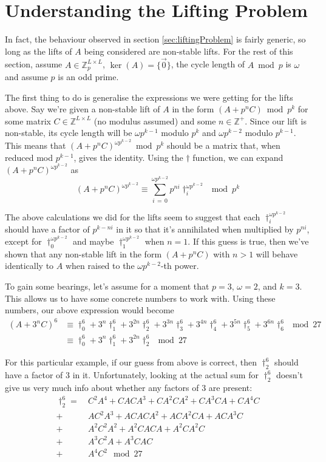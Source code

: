 \documentclass[a4paper, 12pt, reqno]{amsart}
\begin{document}
	\section{Understanding the Lifting Problem}
		\label{sec:understanding1}
		In fact, the behaviour observed in section \ref{sec:liftingProblem} is fairly generic, so long as the lifts of $A$ being considered are non-stable lifts. For the 
		rest of this section, assume $A \in \mathds{Z}_p^{L \times L}$, $\ker(A) = \{\vec{0}\}$, the cycle length of $A \bmod{p}$ is $\omega$ and assume $p$ is an odd prime.
		
		The first thing to do is generalise the expressions we were getting for the lifts above. Say we're given a non-stable lift of $A$ in the form $(A + p^nC) \bmod{p^k}$
		for some matrix $C \in \mathds{Z}^{L \times L}$ (no modulus assumed) and some $n \in \mathds{Z}^+$. Since our lift is non-stable, its cycle length will be 
		$\omega p^{k-1}$ modulo $p^k$ and $\omega p^{k-2}$ modulo $p^{k-1}$. This means that $(A + p^nC)^{\omega p^{k-2}} \bmod{p^k}$ should be a matrix that, when reduced 
		mod $p^{k-1}$, gives the identity. Using the $\dag$ function, we can expand $(A + p^nC)^{\omega p^{k-2}}$ as
		\[
			(A + p^nC)^{\omega p^{k-2}} \equiv \sum_{i\,=\,0}^{\omega p^{k-2}} p^{ni}\dag_i^{\omega p^{k-2}} \mod{p^k}
		\]
		
		The above calculations we did for the lifts seem to suggest that each $\dag_i^{\omega p^{k-2}}$ should have a factor of $p^{k - ni}$ in it so that it's
		annihilated when multiplied by $p^{ni}$, except for $\dag_0^{\omega p^{k-2}}$ and maybe $\dag_1^{\omega p^{k-2}}$ when $n = 1$. If this guess is true, then we've 
		shown that any non-stable lift in the form $(A + p^nC)$ with $n > 1$ will behave identically to $A$ when raised to the $\omega p^{k-2}$-th power.
		
		To gain some bearings, let's assume for a moment that $p = 3$, $\omega = 2$, and $k = 3$. This allows us to have some concrete numbers to work with. Using these
		numbers, our above expression would become
		\begin{align*}
			(A + 3^nC)^6 & \equiv \dag_0^6 + 3^n\dag_1^6 + 3^{2n}\dag_2^6 + 3^{3n}\dag_3^6 + 3^{4n}\dag_4^6 + 3^{5n}\dag_5^6 + 3^{6n}\dag_6^6 \mod{27} \\
			             & \equiv \dag_0^6 + 3^n\dag_1^6 + 3^{2n}\dag_2^6 \mod{27}
		\end{align*}
		
		For this particular example, if our guess from above is correct, then $\dag_2^6$ should have a factor of 3 in it. Unfortunately, looking at the actual sum for 
		$\dag_2^6$ doesn't give us very much info about whether any factors of 3 are present:
		\begin{align*}
			\dag_2^6 =& \ C^2A^4    + CACA^3  + CA^2CA^2 + CA^3CA + CA^4C \\
			         +& \ AC^2A^3   + ACACA^2 + ACA^2CA  + ACA^3C         \\
					 +& \ A^2C^2A^2 + A^2CACA + A^2CA^2C                  \\
					 +& \ A^3C^2A   + A^3CAC                              \\
					 +& \ A^4C^2 \mod{27}
		\end{align*}
		
\end{document}
